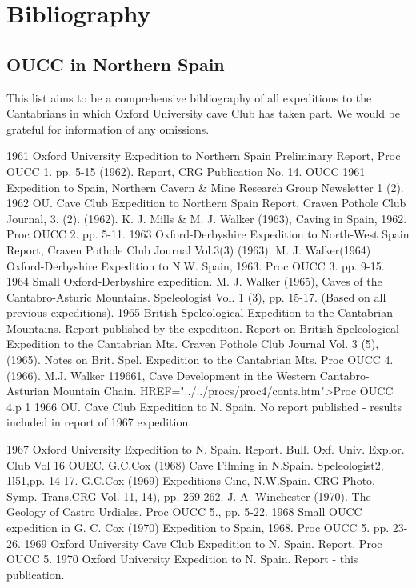 \documentclass[11pt, a4paper, twoside]{memoir}
\begin{document}
\chapter*{Bibliography}

\section*{OUCC in Northern Spain}
This list aims to be a comprehensive bibliography of all expeditions to the Cantabrians in which Oxford University cave Club has taken part. We would be grateful for information of any omissions.

1961 Oxford University Expedition to Northern Spain Preliminary Report, Proc OUCC 1. pp. 5-15 (1962).
Report, CRG Publication No. 14.
OUCC 1961 Expedition to Spain, Northern Cavern \& Mine Research Group Newsletter 1 (2).
1962 OU. Cave Club Expedition to Northern Spain Report, Craven Pothole Club Journal, 3. (2). (1962).
K. J. Mills \& M. J. Walker (1963), Caving in Spain, 1962. Proc OUCC 2. pp. 5-11.
1963 Oxford-Derbyshire Expedition to North-West Spain Report, Craven Pothole Club Journal Vol.3(3) (1963).
M. J. Walker(1964) Oxford-Derbyshire Expedition to N.W. Spain, 1963. Proc OUCC 3. pp. 9-15.
1964 Small Oxford-Derbyshire expedition.
M. J. Walker (1965), Caves of the Cantabro-Asturic Mountains. Speleologist Vol. 1 (3), pp. 15-17. (Based on all previous expeditions).
1965 British Speleological Expedition to the Cantabrian Mountains. Report published by the expedition.
Report on British Speleological Expedition to the Cantabrian Mts. Craven Pothole Club Journal Vol. 3 (5), (1965).
Notes on Brit. Spel. Expedition to the Cantabrian Mts. Proc OUCC 4. (1966).
M.J. Walker 119661, Cave Development in the Western Cantabro-Asturian Mountain Chain. HREF="../../procs/proc4/conts.htm">Proc OUCC 4.p 1
1966 OU. Cave Club Expedition to N. Spain. No report published - results included in report of 1967 expedition.

1967 Oxford University Expedition to N. Spain. Report. Bull. Oxf. Univ. Explor. Club Vol 16 OUEC. G.C.Cox (1968) Cave Filming in N.Spain. Speleologist2, 1l51,pp. 14-17.
G.C.Cox (1969) Expeditions Cine, N.W.Spain. CRG Photo. Symp. Trans.CRG Vol. 11, 14), pp. 259-262.
J. A. Winchester (1970). The Geology of Castro Urdiales. Proc OUCC 5., pp. 5-22.
1968 Small OUCC expedition in G. C. Cox (1970) Expedition to Spain, 1968. Proc OUCC 5. pp. 23-26.
1969 Oxford University Cave Club Expedition to N. Spain. Report. Proc OUCC 5. 1970 Oxford University Expedition to N. Spain. Report - this publication.
\end{document}
